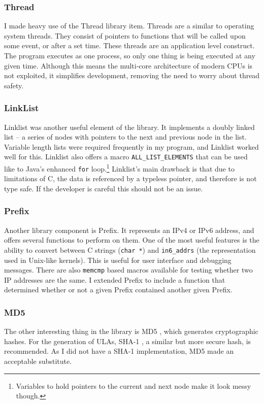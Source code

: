 \subsubsection{Thread}
I made heavy use of the Thread library item. Threads are a similar to operating
system threads. They consist of pointers to functions that will be called upon
some event, or after a set time. These threads are an application level
construct. The program  executes as one process, so only one thing is being
executed at any given time. Although this means the multi-core architecture of
modern CPUs is not exploited, it simplifies development, removing the need to
worry about thread safety.

\subsubsection{LinkList}
Linklist was another useful element of the library. It implements a doubly
linked list -- a series of nodes with pointers to the next and previous node in
the list.  Variable length lists were required frequently in my program, and
Linklist worked well for this. Linklist also offers a macro
\texttt{ALL\_LIST\_ELEMENTS} that can be used like to Java's enhanced
\texttt{for} loop.\footnote{Variables to hold pointers to the current and next
node make it look messy though.} Linklist's main drawback is that due to
limitations of C, the data is referenced by a typeless pointer, and therefore
is not type safe. If the developer is careful this should not be an issue. 

\subsubsection{Prefix}
Another library component is Prefix. It represents an IPv4 or IPv6 address, and
offers several functions to perform on them. One of the most useful features is
the ability to convert between C strings (\texttt{char *}) and
\texttt{in6\_addrs} (the representation used in Unix-like kernels). This is
useful for user interface and debugging messages.  There are also
\texttt{memcmp} based macros available for testing whether two IP addresses are
the same. I extended Prefix to include a function that determined whether or
not a given Prefix contained another given Prefix.

\subsubsection{MD5}
The other interesting thing in the library is MD5
, which generates cryptographic
hashes. For the generation of ULAs, SHA-1 , a similar but more secure hash, is recommended. As I did not have
a SHA-1 implementation, MD5 made an acceptable substitute. 

